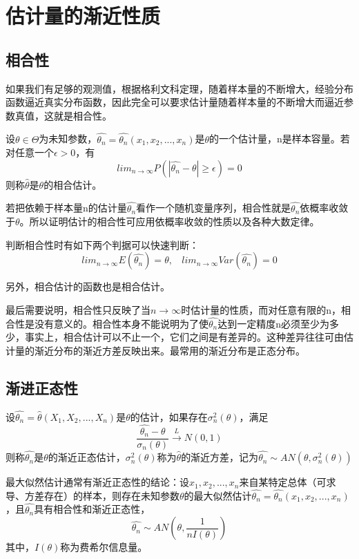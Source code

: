 \documentclass[
]{book}
\begin{document}
\section{估计量的渐近性质}\label{ux4f30ux8ba1ux91cfux7684ux6e10ux8fd1ux6027ux8d28}

\subsection{相合性}\label{ux76f8ux5408ux6027}

如果我们有足够的观测值，根据格利文科定理，随着样本量的不断增大，经验分布函数逼近真实分布函数，因此完全可以要求估计量随着样本量的不断增大而逼近参数真值，这就是相合性。

设\(\theta\in\Theta\)为未知参数，\(\hat{\theta_n}=\hat{\theta_n}(x_1,x_2,...,x_n)\)是\(\theta\)的一个估计量，n是样本容量。若对任意一个\(\epsilon>0\)，有
\[
lim_{n\rightarrow \infty}P(|\hat{\theta_n}-\theta|\geq\epsilon)=0
\]
则称\(\hat{\theta}\)是\(\theta\)的相合估计。

若把依赖于样本量n的估计量\(\hat{\theta_n}\)看作一个随机变量序列，相合性就是\(\hat{\theta_n}\)依概率收敛于\(\theta\)。所以证明估计的相合性可应用依概率收敛的性质以及各种大数定律。

判断相合性时有如下两个判据可以快速判断：
\[
lim_{n\rightarrow \infty}E(\hat{\theta_n})=\theta,\ \ \ \ lim_{n\rightarrow\infty}Var(\hat{\theta_n})=0
\]

另外，相合估计的函数也是相合估计。

最后需要说明，相合性只反映了当\(n\rightarrow \infty\)时估计量的性质，而对任意有限的n，相合性是没有意义的。相合性本身不能说明为了使\(\hat{\theta_n}\)达到一定精度n必须至少为多少，事实上，相合估计可以不止一个，它们之间是有差异的。这种差异往往可由估计量的渐近分布的渐近方差反映出来。最常用的渐近分布是正态分布。

\subsection{渐进正态性}\label{ux6e10ux8fdbux6b63ux6001ux6027}

设\(\hat{\theta_n}=\hat{\theta}(X_1,X_2,...,X_n)\)是\(\theta\)的估计，如果存在\(\sigma_n^2(\theta)\)，满足
\[
\frac{\hat{\theta_n}-\theta}{\sigma_n(\theta)}\xrightarrow{L}N(0,1)
\]
则称\(\hat{\theta_n}\)是\(\theta\)的渐近正态估计，\(\sigma_n^2(\theta)\)称为\(\hat{\theta}\)的渐近方差，记为\(\hat{\theta_n}\sim AN(\theta,\sigma_n^2(\theta))\)

最大似然估计通常有渐近正态性的结论：设\(x_1,x_2,...,x_n\)来自某特定总体（可求导、方差存在）的样本，则存在未知参数\(\theta\)的最大似然估计\(\hat{\theta_n}=\hat{\theta_n}(x_1,x_2,...,x_n)\)，且\(\hat{\theta_n}\)具有相合性和渐近正态性，
\[\hat{\theta_n}\sim AN(\theta,\frac{1}{nI(\theta)})\]
其中，\(I(\theta)\)称为费希尔信息量。
\end{document}
